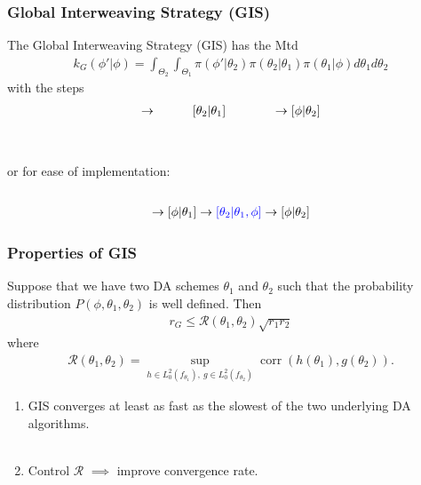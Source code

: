 \documentclass[xcolor=dvipsnames]{beamer}
\DeclareMathOperator{\corr}{corr}
\begin{document}
\begin{frame}
\frametitle{Global Interweaving Strategy (GIS)}

The Global Interweaving Strategy (GIS) has the Mtd
\begin{align*}
k_G(\phi'|\phi) = \int_{\Theta_2}\int_{\Theta_1}\pi(\phi'|\theta_2)\pi(\theta_2|\theta_1)\pi(\theta_1|\phi)d\theta_1d\theta_2
\end{align*}
with the steps
\begin{align*}
[\theta_1|\phi] \to \hspace{1cm} [\theta_2|\theta_1] \hspace{1.3cm} \to [\phi|\theta_2]
\end{align*}\\~\\
\pause or for ease of implementation:\\~
\begin{align*}
[\theta_1|\phi] \to [\phi|\theta_1] \to {\color{blue}[\theta_2|\theta_1,\phi]} \to [\phi|\theta_2]
\end{align*}
\end{frame}

\begin{frame}
\frametitle{Properties of GIS}
\begin{theorem}
Suppose that we have two DA schemes $\theta_1$ and $\theta_2$ such that the probability distribution $P(\phi,\theta_1,\theta_2)$ is well defined. Then
\begin{align*}
r_{G}\leq \mathcal{R}(\theta_1,\theta_2)\sqrt{r_1r_2}
\end{align*}
where
\begin{align*}
\mathcal{R}(\theta_1,\theta_2) = \sup_{h\in L_0^2(f_{\theta_1}),\ g\in L_0^2(f_{\theta_2})} \corr(h(\theta_1),g(\theta_2)).
\end{align*}
\end{theorem}
\pause
\begin{enumerate}
\item GIS converges at least as fast as the slowest of the two underlying DA algorithms.\\~
\item Control $\mathcal{R}$ $\implies$ improve convergence rate.
\end{enumerate}
\end{frame}
\end{document}
